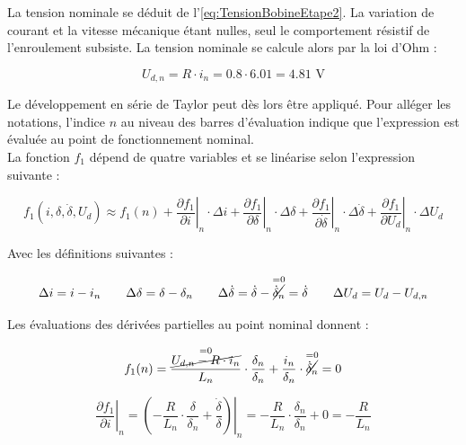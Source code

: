 La tension nominale se déduit de l'\autoref{eq:TensionBobineEtape2}. La variation de courant et la vitesse mécanique étant nulles, seul le comportement résistif de l'enroulement subsiste. La tension nominale se calcule alors par la loi d'Ohm :

\begin{equation}
    U_{d,n} = R\cdot i_n = 0.8 \cdot 6.01 = 4.81 \text{ V}
\end{equation}

Le développement en série de Taylor peut dès lors être appliqué. Pour alléger les notations, l'indice $n$ au niveau des barres d'évaluation indique que l'expression est évaluée au point de fonctionnement nominal.\\

La fonction $f_1$ dépend de quatre variables et se linéarise selon l'expression suivante :

\begin{equation}
    f_1(i, \delta, \dot{\delta}, U_d) \approx f_1(n)
    + \left. \frac{\partial f_1}{\partial i} \right|_{n}\cdot\Delta{i}
    + \left. \frac{\partial f_1}{\partial \delta} \right|_{n}\cdot\Delta{\delta}
    + \left. \frac{\partial f_1}{\partial \dot{\delta}} \right|_{n}\cdot\Delta{\dot{\delta}}
    + \left. \frac{\partial f_1}{\partial U_d} \right|_{n}\cdot\Delta{U_d}
    \label{eq:f1Lin1}
\end{equation}

Avec les définitions suivantes :

\begin{equation}
    \Delta i = i-i_n \qquad \Delta\delta = \delta-\delta_n \qquad \Delta\dot{\delta} = \dot{\delta}-\overset{=0}{\cancel{\dot{\delta}_n}} = \dot{\delta} \qquad \Delta U_d = U_d-U_{d,n}
    \label{eq:DeltaDef}
\end{equation}

Les évaluations des dérivées partielles au point nominal donnent :

\begin{equation}
    f_1(n)  = \frac{\overset{=0}{\cancel{U_{d,n} - R \cdot i_n}}}{L_n} \cdot \frac{\delta_n}{\delta_n} + \frac{i_n}{\delta_n} \cdot \overset{=0}{\cancel{\dot{\delta}_n}} = 0
    \label{eq:DerivePart1}
\end{equation}

\begin{equation}
    \left. \frac{\partial f_1}{\partial i} \right|_{n} = \left. \left(-\frac{R}{L_n}\cdot\frac{\delta}{\delta_n}+\frac{\dot{\delta}}{\delta}\right) \right|_{n} = -\frac{R}{L_n}\cdot\frac{\delta_n}{\delta_n}+0 = -\frac{R}{L_n}
    \label{eq:DerivePart2}
\end{equation}

